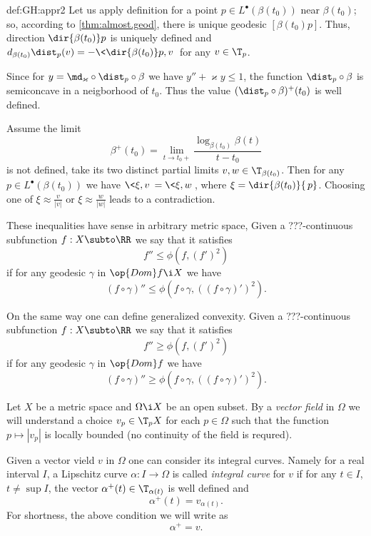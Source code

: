 {\begin{subthm}{def:GH:appr2}
Let us apply definition for a point $p\in L^\bullet(\beta(t_0))$ near $\beta(t_0)$; 
so, according to \ref{thm:almost.geod}, there is unique geodesic $[{\beta(t_0)}p]$.
Thus, direction $\dir{\beta(t_0)}p$ is uniquely defined and $d_{\beta(t_0)}\dist_p(v)=-\<\dir{\beta(t_0)}p,v\>$ for any $v\in \T_p$.

Since for $y=\md_\varkappa\circ\dist_p\circ\beta$ we have $y''+\varkappa y\le 1$,
the function $\dist_p\circ\beta$ is semiconcave in a neigborhood of $t_0$.
Thus the value $(\dist_p\circ\beta)^+(t_0)$ is well defined.

Assume the limit 
$$\beta^+(t_0)=\lim_{t\to t_0+}\frac{\log_{\beta(t_0)}\beta(t)}{t-t_0}$$ 
is not defined,
take its two distinct partial limits $v,w\in\T_{\beta(t_0)}$.
Then for any $p\in L^\bullet(\beta(t_0))$ we have $\<\xi,v\>=\<\xi,w\>$, where  
$\xi=\dir{\beta(t_0)}{\,p}$.
Choosing one of $\xi\approx \tfrac{v}{|v|}$ or $\xi\approx \tfrac{w}{|w|}$ leads to a contradiction.



















These inequalities have sense in arbitrary metric space,
Given a ???-continuous subfunction $f:X\subto\RR$ we say that it satisfies
$$f''\le \phi(f,(f')^2)$$
if for any geodesic $\gamma$ in $\op{Dom}f\i X$ we have
$$(f\circ\gamma)''\le \phi(f\circ\gamma,((f\circ\gamma)')^2).$$

On the same way one can define generalized convexity.
Given a ???-continuous subfunction $f:X\subto\RR$ we say that it satisfies
$$f''\ge \phi(f,(f')^2)$$
if for any geodesic $\gamma$ in $\op{Dom}f$ we have
$$(f\circ\gamma)''\ge \phi(f\circ\gamma,((f\circ\gamma)')^2).$$










Let $X$ be a metric space and $\Omega\i X$ be an open subset.
By a \emph{vector field} in $\Omega$ we will understand a choice $v_p\in \T_pX$ for each $p\in \Omega$ such that the function $p\mapsto|v_p|$ is locally bounded (no continuity of the field is requred).

Given a vector vield $v$ in $\Omega$ one can consider its integral curves.
Namely for a real interval $I$, a Lipschitz curve $\alpha:I\to\Omega$ is called \emph{integral curve} for $v$ if for any $t\in I$, $t\not=\sup I$, the vector $\alpha^+(t)\in \T_{\alpha(t)}$ is well defined and
$$\alpha^+(t)=v_{\alpha(t)}.$$
For shortness, the above condition we will write as 
$$\alpha^+=v.$$


\end{subthm}}
